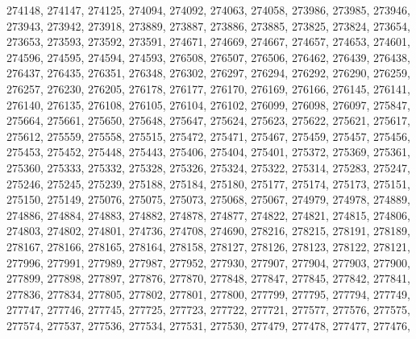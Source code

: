 \begin{appendix}
\begin{itemize}
     274148, 274147, 274125, 274094, 274092, 274063, 274058, 273986, 273985, 273946,\\
     273943, 273942, 273918, 273889, 273887, 273886, 273885, 273825, 273824, 273654,\\
     273653, 273593, 273592, 273591, 274671, 274669, 274667, 274657, 274653, 274601,\\
     274596, 274595, 274594, 274593, 276508, 276507, 276506, 276462, 276439, 276438,\\
     276437, 276435, 276351, 276348, 276302, 276297, 276294, 276292, 276290, 276259,\\
     276257, 276230, 276205, 276178, 276177, 276170, 276169, 276166, 276145, 276141,\\
     276140, 276135, 276108, 276105, 276104, 276102, 276099, 276098, 276097, 275847,\\
     275664, 275661, 275650, 275648, 275647, 275624, 275623, 275622, 275621, 275617,\\
     275612, 275559, 275558, 275515, 275472, 275471, 275467, 275459, 275457, 275456,\\
     275453, 275452, 275448, 275443, 275406, 275404, 275401, 275372, 275369, 275361,\\
     275360, 275333, 275332, 275328, 275326, 275324, 275322, 275314, 275283, 275247,\\
     275246, 275245, 275239, 275188, 275184, 275180, 275177, 275174, 275173, 275151,\\
     275150, 275149, 275076, 275075, 275073, 275068, 275067, 274979, 274978, 274889,\\
     274886, 274884, 274883, 274882, 274878, 274877, 274822, 274821, 274815, 274806,\\
     274803, 274802, 274801, 274736, 274708, 274690, 278216, 278215, 278191, 278189,\\
     278167, 278166, 278165, 278164, 278158, 278127, 278126, 278123, 278122, 278121,\\
     277996, 277991, 277989, 277987, 277952, 277930, 277907, 277904, 277903, 277900,\\
     277899, 277898, 277897, 277876, 277870, 277848, 277847, 277845, 277842, 277841,\\
     277836, 277834, 277805, 277802, 277801, 277800, 277799, 277795, 277794, 277749,\\
     277747, 277746, 277745, 277725, 277723, 277722, 277721, 277577, 277576, 277575,\\
     277574, 277537, 277536, 277534, 277531, 277530, 277479, 277478, 277477, 277476,\\

\end{itemize}
\end{appendix}
